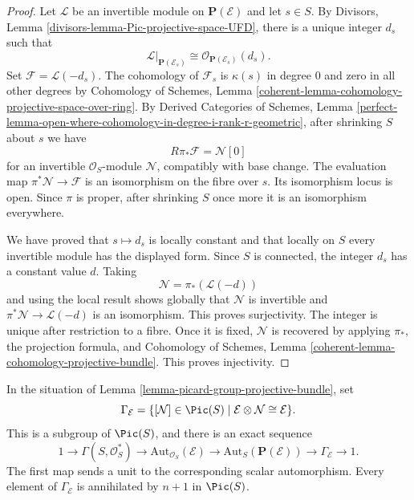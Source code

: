 \begin{proof}
Let $\mathcal{L}$ be an invertible module on $\mathbf{P}(\mathcal{E})$ and
let $s \in S$. By Divisors, Lemma
\ref{divisors-lemma-Pic-projective-space-UFD}, there is a unique integer $d_s$
such that
$$
\mathcal{L}|_{\mathbf{P}(\mathcal{E}_s)} \cong
\mathcal{O}_{\mathbf{P}(\mathcal{E}_s)}(d_s).
$$
Set $\mathcal{F} = \mathcal{L}(-d_s)$. The cohomology of $\mathcal{F}_s$
is $\kappa(s)$ in degree $0$ and zero in all other degrees by Cohomology of
Schemes, Lemma
\ref{coherent-lemma-cohomology-projective-space-over-ring}. By Derived
Categories of Schemes, Lemma
\ref{perfect-lemma-open-where-cohomology-in-degree-i-rank-r-geometric}, after
shrinking $S$ about $s$ we have
$$
R\pi_*\mathcal{F} = \mathcal{N}[0]
$$
for an invertible $\mathcal{O}_S$-module $\mathcal{N}$, compatibly with base
change. The evaluation map $\pi^*\mathcal{N} \to \mathcal{F}$ is an
isomorphism on the fibre over $s$. Its isomorphism locus is open. Since $\pi$
is proper, after shrinking $S$ once more it is an isomorphism everywhere.

We have proved that $s \mapsto d_s$ is locally constant and that locally on
$S$ every invertible module has the displayed form. Since $S$ is connected,
the integer $d_s$ has a constant value $d$. Taking
$$
\mathcal{N} = \pi_*(\mathcal{L}(-d))
$$
and using the local result shows globally that $\mathcal{N}$ is invertible and
$\pi^*\mathcal{N} \to \mathcal{L}(-d)$ is an isomorphism. This proves
surjectivity. The integer is unique after restriction to a fibre. Once it is
fixed, $\mathcal{N}$ is recovered by applying $\pi_*$, the projection formula,
and Cohomology of Schemes, Lemma
\ref{coherent-lemma-cohomology-projective-bundle}. This proves injectivity.
\end{proof}

\begin{lemma}
\label{lemma-automorphisms-projective-bundle}
In the situation of Lemma \ref{lemma-picard-group-projective-bundle}, set
$$
\Gamma_{\mathcal{E}} =
\{[\mathcal{N}] \in \Pic(S) \mid
\mathcal{E} \otimes \mathcal{N} \cong \mathcal{E}\}.
$$
This is a subgroup of $\Pic(S)$, and there is an exact sequence
$$
1 \longrightarrow \Gamma(S, \mathcal{O}_S^*) \longrightarrow
\text{Aut}_{\mathcal{O}_S}(\mathcal{E}) \longrightarrow
\text{Aut}_S(\mathbf{P}(\mathcal{E})) \longrightarrow
\Gamma_{\mathcal{E}} \longrightarrow 1.
$$
The first map sends a unit to the corresponding scalar automorphism. Every
element of $\Gamma_{\mathcal{E}}$ is annihilated by $n + 1$ in $\Pic(S)$.
\end{lemma}

